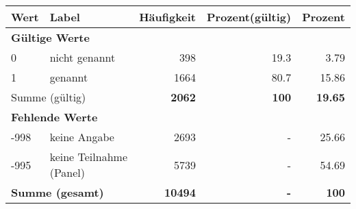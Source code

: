      \begin{longtable}{lXrrr}
     \toprule
     \textbf{Wert} & \textbf{Label} & \textbf{Häufigkeit} & \textbf{Prozent(gültig)} & \textbf{Prozent} \\
     \endhead
     \midrule
     \multicolumn{5}{l}{\textbf{Gültige Werte}}\\

     0 &
     \multicolumn{1}{X}{ nicht genannt   } &


       \num{398} &
       \num[round-mode=places,round-precision=2]{19,3} &
         \num[round-mode=places,round-precision=2]{3,79} \\

     1 &
     \multicolumn{1}{X}{ genannt   } &


       \num{1664} &
       \num[round-mode=places,round-precision=2]{80,7} &
         \num[round-mode=places,round-precision=2]{15,86} \\
     \midrule
     \multicolumn{2}{l}{Summe (gültig)} &
       \textbf{\num{2062}} &
     \textbf{100} &
       \textbf{\num[round-mode=places,round-precision=2]{19,65}} \\
     \multicolumn{5}{l}{\textbf{Fehlende Werte}}\\
       -998 &
       keine Angabe &
         \num{2693} &
        - &
         \num[round-mode=places,round-precision=2]{25,66} \\
       -995 &
       keine Teilnahme (Panel) &
         \num{5739} &
        - &
         \num[round-mode=places,round-precision=2]{54,69} \\
     \midrule
     \multicolumn{2}{l}{\textbf{Summe (gesamt)}} &
          \textbf{\num{10494}} &
        \textbf{-} &
        \textbf{100} \\
     \bottomrule
     \end{longtable}
     
